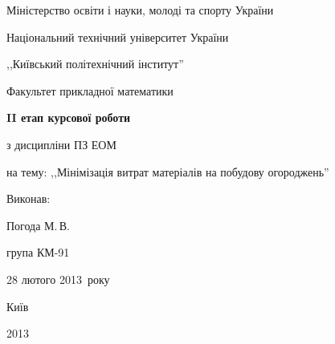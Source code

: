 \documentclass[a4paper,12pt,notitlepage,pdftex]{scrartcl}
\begin{document}
\begin{titlepage}
    \Large
    \begin{center}
        Міністерство освіти і науки, молоді та спорту України

        Національний технічний університет України

        ,,Київський політехнічний інститут''

        \vspace*{1cm}

        Факультет прикладної математики

        \vspace*{3.5cm}

        \textbf{II етап курсової роботи}

        з дисципліни ПЗ ЕОМ

        на тему: ,,Мінімізація витрат матеріалів на побудову огороджень''
    \end{center}

    \vspace*{4cm}

    Виконав:\hfill
        \begin{minipage}{0.3\textwidth}
            Погода М.\,В.

            група КМ-91
        \end{minipage}

    \vspace*{1cm}

    \hfill 28 лютого 2013~року

    \vfill

    \begin{center}
        \Large
        Київ

        2013
    \end{center}
\end{titlepage}
\end{document}
